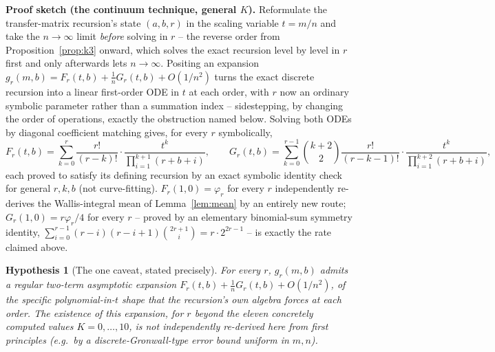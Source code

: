 \documentclass[11pt]{article}
\newtheorem{hypothesis}{Hypothesis}
\theoremstyle{remark}
\begin{document}
\textbf{Proof sketch (the continuum technique, general $K$).} Reformulate
the transfer-matrix recursion's state $(a,b,r)$ in the scaling variable
$t=m/n$ and take the $n\to\infty$ limit \emph{before} solving in $r$ --
the reverse order from Proposition~\ref{prop:k3} onward, which solves the
exact recursion level by level in $r$ first and only afterwards lets
$n\to\infty$. Positing an expansion $g_r(m,b) = F_r(t,b) +
\tfrac1nG_r(t,b) + O(1/n^2)$ turns the exact discrete recursion into a
linear first-order ODE in $t$ at each order, with $r$ now an ordinary
symbolic parameter rather than a summation index -- sidestepping, by
changing the order of operations, exactly the obstruction named below.
Solving both ODEs by diagonal coefficient matching gives, for every $r$
symbolically,
\[
  F_r(t,b) = \sum_{k=0}^{r}\frac{r!}{(r-k)!}\cdot\frac{t^k}{\prod_{i=1}^{k+1}(r+b+i)},
  \qquad
  G_r(t,b) = \sum_{k=0}^{r-1}\binom{k+2}{2}\frac{r!}{(r-k-1)!}\cdot\frac{t^k}{\prod_{i=1}^{k+2}(r+b+i)},
\]
each proved to satisfy its defining recursion by an exact symbolic
identity check for general $r,k,b$ (not curve-fitting). $F_r(1,0)=
\varphi_r$ for every $r$ independently re-derives the Wallis-integral
mean of Lemma~\ref{lem:mean} by an entirely new route; $G_r(1,0)=
r\varphi_r/4$ for every $r$ -- proved by an elementary binomial-sum
symmetry identity, $\sum_{i=0}^{r-1}(r{-}i)(r{-}i{+}1)\binom{2r+1}{i} =
r\cdot2^{2r-1}$ -- is exactly the rate claimed above.

\begin{hypothesis}[The one caveat, stated precisely]
\label{hyp:regularity}
For every $r$, $g_r(m,b)$ admits a regular two-term asymptotic expansion
$F_r(t,b)+\tfrac1nG_r(t,b)+O(1/n^2)$, of the specific polynomial-in-$t$
shape that the recursion's own algebra forces at each order. The
\emph{existence} of this expansion, for $r$ beyond the eleven
concretely computed values $K=0,\dots,10$, is not independently
re-derived here from first principles (e.g.\ by a discrete-Gronwall-type
error bound uniform in $m,n$).
\end{hypothesis}
\end{document}
